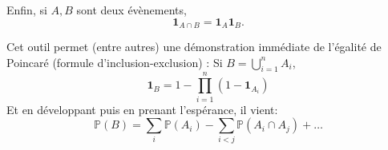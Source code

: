 \documentclass[]{book}
\theoremstyle{definition}
\theoremstyle{definition}
\theoremstyle{definition}
\theoremstyle{remark}
\begin{document}
Enfin, si \(A,B\) sont deux évènements, \[
\mathbf{1}_{A \cap B} = \mathbf{1}_A \mathbf{1}_B.\]

Cet outil permet (entre autres) une démonstration immédiate de l'égalité de Poincaré (formule d'inclusion-exclusion) :
Si \(B = \bigcup_{i=1}^n A_i\),
\[\mathbf{1}_B =1- \prod_{i=1}^n (1-\mathbf{1}_{A_i})\]
Et en développant puis en prenant l'espérance, il vient:
\[\mathbb{P}(B) = \sum_i \mathbb{P}(A_i) - \sum_{i<j} \mathbb{P}(A_i \cap A_j)+  \ldots  \]


\end{document}
